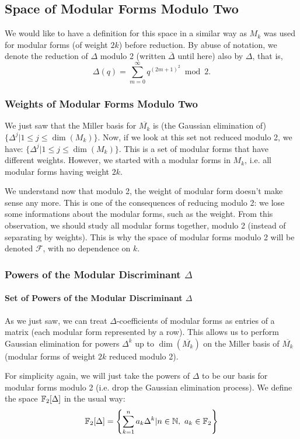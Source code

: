 \subsection{Space of Modular Forms Modulo Two}
We would like to have a definition for this space in a similar way as $M_k$ was used for modular forms (of weight $2k$) before reduction.
By abuse of notation, we denote the reduction of $\Delta$ modulo 2 (written $\overline{\Delta}$ until here) also by $\Delta$, that is,
$$
\Delta(q) = \sum_{m=0}^{\infty} q^{(2m+1)^2} \bmod 2.
$$
\subsubsection{Weights of Modular Forms Modulo Two}
\label{WeightModuloTwo}
We just saw that the Miller basis for $\overline{M_k}$ is (the Gaussian elimination of) $\{ \Delta^j | 1 \leq j \leq \dim(M_k) \}$.
Now, if we look at this set not reduced modulo 2, we have:
$\{ \Delta^j | 1 \leq j \leq \dim(M_k) \}$.
This is a set of modular forms that have different weights.
However, we started with a modular forms in $M_k$, i.e. all modular forms having weight $2k$.

We understand now that modulo 2, the weight of modular form doesn't make sense any more.
This is one of the consequences of reducing modulo 2: we lose some informations about the modular forms, such as the weight.
From this observation, we should study all modular forms together, modulo 2 (instead of separating by weights).
This is why the space of modular forms modulo 2 will be denoted  $\mathcal{F}$, with no dependence on $k$.

\subsubsection{Powers of the Modular Discriminant $\Delta$}
\paragraph{Set of Powers of the Modular Discriminant $\Delta$}
As we just saw, we can treat $\Delta$-coefficients of modular forms as entries of a matrix (each modular form represented by a row).
This allows us to perform Gaussian elimination for powers $\Delta^k$ up to $\dim(\overline{M_k})$ on the Miller basis of $\overline{M_k}$ (modular forms of weight $2k$ reduced modulo 2).

For simplicity again, we will just take the powers of $\Delta$ to be our basis for modular forms modulo 2 (i.e. drop the Gaussian elimination process).
We define the space $\mathbb{F}_2[\Delta]$ in the usual way:
$$
\mathbb{F}_2[\Delta] = \left\lbrace \sum_{k=1}^{n}a_k \Delta^k | n \in \mathbb{N}, \  a_k \in \mathbb{F}_2 \right\rbrace
$$


